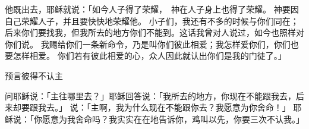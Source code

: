 {\par }{\PP {}他既出去，耶稣就说：「如今人子得了荣耀，　神在人子身上也得了荣耀。
神要因自己荣耀人子，并且要快快地荣耀他。
小子们，我还有不多的时候与你们同在；后来你们要找我，但我所去的地方你们不能到。这话我曾对{}人说过，如今也照样对你们说。
我赐给你们一条新命令，乃是叫你们彼此相爱；我怎样爱你们，你们也要怎样相爱。
你们若有彼此相爱的心，众人因此就认出你们是我的门徒了。」
\par }{\SH 预言彼得不认主
\par }{\PP {}问耶稣说：「主往哪里去？」耶稣回答说：「我所去的地方，你现在不能跟我去，后来却要跟我去。」
说：「主啊，我为什么现在不能跟你去？我愿意为你舍命！」
耶稣说：「你愿意为我舍命吗？我实实在在地告诉你，鸡叫以先，你要三次不认我。」

}
